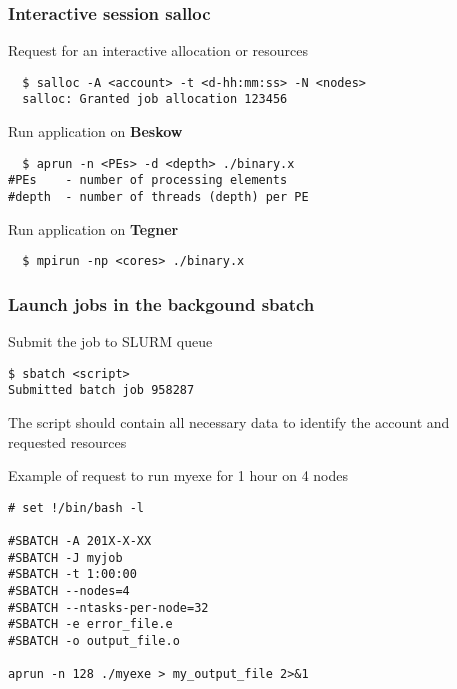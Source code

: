 \begin{frame}[fragile]
\frametitle{Interactive session \hfill \alert{\textbf{salloc}}}

\begin{exampleblock}{Request for an interactive allocation or resources}
  \begin{verbatim}
  $ salloc -A <account> -t <d-hh:mm:ss> -N <nodes>
  salloc: Granted job allocation 123456
   \end{verbatim}
\end{exampleblock}

\begin{exampleblock}{Run application on \alert{\textbf{Beskow}}}
  \begin{verbatim}
  $ aprun -n <PEs> -d <depth> ./binary.x
#PEs 	- number of processing elements
#depth 	- number of threads (depth) per PE
  \end{verbatim}
\end{exampleblock}
  
  
\begin{exampleblock}{Run application on \alert{\textbf{Tegner}}}

  \begin{verbatim}
  $ mpirun -np <cores> ./binary.x
  \end{verbatim}
\end{exampleblock}
\end{frame}

\begin{frame}[fragile]
\frametitle{Launch jobs in the backgound \hfill  \alert{\textbf{sbatch}}}
\begin{exampleblock}{Submit the job to SLURM queue}
  \begin{verbatim}
$ sbatch <script>
Submitted batch job 958287
  \end{verbatim}
\end{exampleblock}

\scriptsize
The script should contain all necessary data to identify the account and requested resources 
\begin{exampleblock}{Example of request to run myexe for 1 hour on 4 nodes}
  \begin{verbatim}
# set !/bin/bash -l

#SBATCH -A 201X-X-XX
#SBATCH -J myjob
#SBATCH -t 1:00:00
#SBATCH --nodes=4
#SBATCH --ntasks-per-node=32
#SBATCH -e error_file.e
#SBATCH -o output_file.o

aprun -n 128 ./myexe > my_output_file 2>&1
  \end{verbatim}
\end{exampleblock}

\end{frame}

